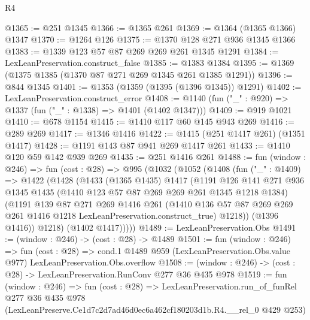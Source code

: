 \begin{lexlean}{R4}
\begin{coremodule}
@1365 := @251 @1345
@1366 := @1365 @261
@1369 := @1364 (@1365 @1366) @1347
@1370 := @1264 @126
@1375 := @1370 @128 @271 @936 @1345 @1366
@1383 := @1339 @123 @57 @87 @269 @269 @261 @1345 @1291
@1384 := LexLeanPreservation.construct_false
@1385 := @1383 @1384
@1395 := @1369 (@1375 @1385 (@1370 @87 @271 @269 @1345 @261 @1385 @1291))
@1396 := @844 @1345
@1401 := @1353 (@1359 (@1395 (@1396 @1345)) @1291)
@1402 := LexLeanPreservation.construct_error
@1408 := @1140 (fun ("_" : @920) => @1337 (fun ("_" : @1338) => @1401 (@1402 @1347)))
@1409 := @919 @1021
@1410 := @678 @1154
@1415 := @1410 @117 @60 @145 @943 @269
@1416 := @289 @269
@1417 := @1346 @1416
@1422 := @1415 (@251 @1417 @261) (@1351 @1417)
@1428 := @1191 @143 @87 @941 @269 @1417 @261
@1433 := @1410 @120 @59 @142 @939 @269
@1435 := @251 @1416 @261
@1488 := fun (window : @246) =>
  fun (cost : @28) =>
  @995
    (@1032
      (@1052
        (@1408
          (fun ("_" : @1409) =>
          @1422
            (@1428
              (@1433
                (@1365 @1435)
                @1417
                (@1191
                  @126
                  @141
                  @271
                  @936
                  @1345
                  @1435
                  (@1410 @123 @57 @87 @269 @269 @261 @1345 @1218 @1384)
                  (@1191
                    @139
                    @87
                    @271
                    @269
                    @1416
                    @261
                    (@1410
                      @136
                      @57
                      @87
                      @269
                      @269
                      @261
                      @1416
                      @1218
                      LexLeanPreservation.construct_true)
                    @1218))
                (@1396 @1416))
              @1218)
            (@1402 @1417)))))
@1489 := LexLeanPreservation.Obs
@1491 := (window : @246) -> (cost : @28) -> @1489
@1501 := fun (window : @246) =>
  fun (cost : @28) =>
  cond.{1} @1489 @959 (LexLeanPreservation.Obs.value @977) LexLeanPreservation.Obs.overflow
@1508 := (window : @246) -> (cost : @28) -> LexLeanPreservation.RunConv @277 @36 @435 @978
@1519 := fun (window : @246) =>
  fun (cost : @28) =>
  LexLeanPreservation.run_of_funRel
    @277
    @36
    @435
    @978
    (LexLeanPreserve.Ce1d7c2d7ad46d0ec6a462cf180203d1b.R4.__rel_0 @429 @253)
\end{coremodule}
\end{lexlean}
